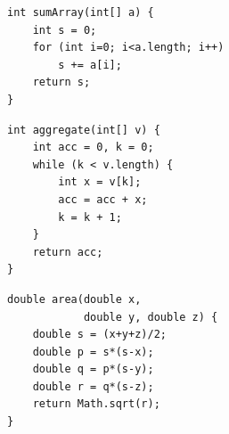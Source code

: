 \documentclass[final,5p,times,twocolumn]{elsarticle}
\theoremstyle{plain}
\begin{document}
\begin{figure}[t]
\centering
\begin{minipage}[t]{0.32\linewidth}
\begin{lstlisting}[style=javastyle,caption={A: sum with a for loop.},label={lst:for}]
int sumArray(int[] a) {
    int s = 0;
    for (int i=0; i<a.length; i++)
        s += a[i];
    return s;
}
\end{lstlisting}
\end{minipage}\hfill
\begin{minipage}[t]{0.32\linewidth}
\begin{lstlisting}[style=javastyle,caption={B: sum with a while loop.},label={lst:while}]
int aggregate(int[] v) {
    int acc = 0, k = 0;
    while (k < v.length) {
        int x = v[k];
        acc = acc + x;
        k = k + 1;
    }
    return acc;
}
\end{lstlisting}
\end{minipage}\hfill
\begin{minipage}[t]{0.32\linewidth}
\begin{lstlisting}[style=javastyle,caption={C: triangle area (unrelated).},label={lst:area}]
double area(double x,
            double y, double z) {
    double s = (x+y+z)/2;
    double p = s*(s-x);
    double q = p*(s-y);
    double r = q*(s-z);
    return Math.sqrt(r);
}
\end{lstlisting}
\end{minipage}


\end{figure}
\end{document}
